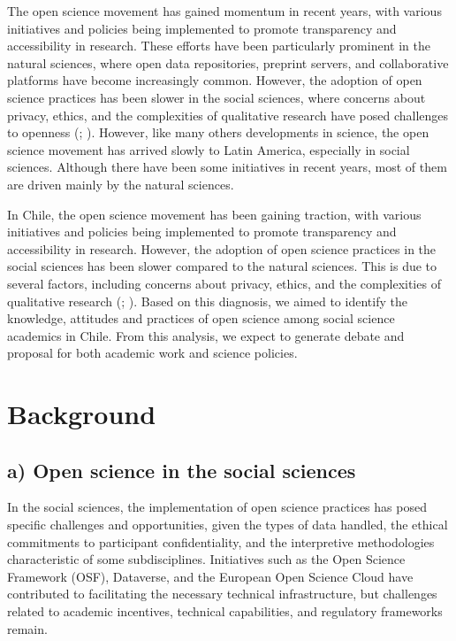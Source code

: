 \documentclass[
  letterpaper,
]{article}
\begin{document}
The open science movement has gained momentum in recent years, with
various initiatives and policies being implemented to promote
transparency and accessibility in research. These efforts have been
particularly prominent in the natural sciences, where open data
repositories, preprint servers, and collaborative platforms have become
increasingly common. However, the adoption of open science practices has
been slower in the social sciences, where concerns about privacy,
ethics, and the complexities of qualitative research have posed
challenges to openness
(;
). However,
like many others developments in science, the open science movement has
arrived slowly to Latin America, especially in social sciences. Although
there have been some initiatives in recent years, most of them are
driven mainly by the natural sciences.

In Chile, the open science movement has been gaining traction, with
various initiatives and policies being implemented to promote
transparency and accessibility in research. However, the adoption of
open science practices in the social sciences has been slower compared
to the natural sciences. This is due to several factors, including
concerns about privacy, ethics, and the complexities of qualitative
research
(;
). Based on
this diagnosis, we aimed to identify the knowledge, attitudes and
practices of open science among social science academics in Chile. From
this analysis, we expect to generate debate and proposal for both
academic work and science policies.

\section{Background}\label{background}

\subsection{a) Open science in the social
sciences}\label{a-open-science-in-the-social-sciences}

In the social sciences, the implementation of open science practices has
posed specific challenges and opportunities, given the types of data
handled, the ethical commitments to participant confidentiality, and the
interpretive methodologies characteristic of some subdisciplines.
Initiatives such as the Open Science Framework (OSF), Dataverse, and the
European Open Science Cloud have contributed to facilitating the
necessary technical infrastructure, but challenges related to academic
incentives, technical capabilities, and regulatory frameworks remain.
\end{document}

